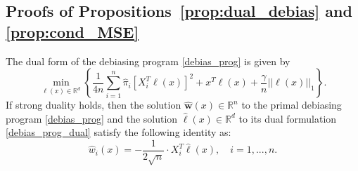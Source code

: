 \documentclass[ejsv2,noshowframe]{imsart}
\theoremstyle{plain}
\theoremstyle{definition}
\theoremstyle{remark}
\newcommand{\norm}[1]{\left|\left| #1 \right|\right|}
\renewcommand{\hat}{\widehat}
\newenvironment{customprop}[1]
{\renewcommand\theinnercustomprop{#1}\innercustomprop}
{\endinnercustomprop}
\begin{document}
\subsection{Proofs of Propositions~\ref{prop:dual_debias} and \ref{prop:cond_MSE}}
\label{subapp:cond_MSE}

\begin{customprop}{2.1}
	The dual form of the debiasing program \eqref{debias_prog} is given by
	\begin{equation*}
		\min_{\ell(x) \in \mathbb{R}^d} \left\{\frac{1}{4n} \sum_{i=1}^n \hat{\pi}_i \left[X_i^T \ell(x)\right]^2 + x^T \ell(x) +\frac{\gamma}{n}\norm{\ell(x)}_1 \right\}.
	\end{equation*}
	If strong duality holds, then the solution $\hat{\bm{w}}(x) \in \mathbb{R}^n$ to the primal debiasing program \eqref{debias_prog} and the solution $\hat{\ell}(x) \in \mathbb{R}^d$ to its dual formulation \eqref{debias_prog_dual} satisfy the following identity as: 
	\begin{equation*}
		\hat{w}_i(x) = -\frac{1}{2\sqrt{n}} \cdot X_i^T\hat{\ell}(x), \quad i=1,...,n.
	\end{equation*}
\end{customprop}
\end{document}
